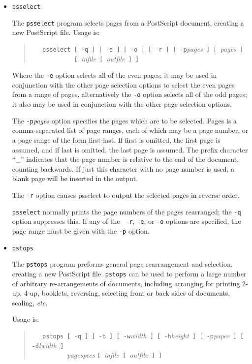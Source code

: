 \documentclass[twoside,11pt]{article}
\begin{document}
\begin{itemize}
\item {\tt psselect}

The {\tt psselect} program selects pages from a PostScript document,
creating a new PostScript file. Usage is:

\begin{quote}
\verb+   psselect [ -q ] [ -e ] [ -o ] [ -r ] [ -p+{\em pages}\verb+ ] [ +{\em pages}\verb+ ]+\\
\verb+            [ +{\em infile}\verb+ [ +{\em outfile}\verb+ ] ]+
\end{quote}

Where the {\tt -e} option selects all of the even pages; it may be
used in conjunction with the other page selection options to select
the even pages from a range of pages, alternatively the {\tt -o}
option selects all of the odd pages; it also may be used in
conjunction with the other page selection options.

The {\tt -p}{\em pages} option specifies the pages which are to be
selected. Pages is a comma-separated list of page ranges, each of
which may be a page number, or a page range of the form first-last. If
first is omitted, the first page is assumed, and if last is omitted,
the last page is assumed. The prefix character ``\_'' indicates that
the page number is relative to the end of the document, counting
backwards. If just this character with no page number is used, a blank
page will be inserted in the output.

The {\tt -r} option causes psselect to output the selected pages in reverse order.

{\tt psselect} normally prints the page numbers of the pages
rearranged; the {\tt -q} option suppresses this.  If any of the {\tt
-r}, {\tt -e}, or {\tt -o} options are specified, the page range must
be given with the {\tt -p} option.

\item {\tt pstops}

The {\tt pstops} program preforms general page rearrangement and
selection, creating a new PostScript file. {\tt pstops} can be used to
perform a large number of arbitrary re-arrangements of documents,
including arranging for printing 2-up, 4-up, booklets, reversing,
selecting front or back sides of documents, scaling, {\em etc.\ }

Usage is:

\begin{quote}
\verb+   pstops [ -q ] [ -b ] [ -w+{\em width}\verb+ ] [ -h+{\em height}\verb+ ] [ -p+{\em paper}\verb+ ] [ -d+{\em lwidth}\verb+ ] +\\
\verb+          +{\em pagespecs} \verb+[ +{\em infile}\verb+ [ +{\em outfile}\verb+ ] ]+
\end{quote}


\end{itemize}
\end{document}
